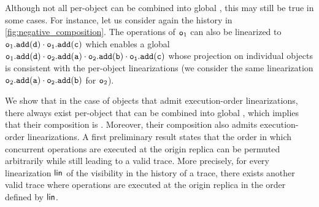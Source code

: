 Although not all per-object  can be combined into global , this may still be true in some cases. For instance, let us consider again the history in \autoref{fig:negative_composition}. The operations of $\mathtt{o}_1$ can also be linearized to $\aobj_1.\alabelshort[{\tt add}]{d}\cdot \aobj_1.\alabelshort[{\tt add}]{c}$ which enables a global \crdtlinearization{} $\aobj_1.\alabelshort[{\tt add}]{d}\cdot \aobj_2.\alabelshort[{\tt add}]{a}\cdot \aobj_2.\alabelshort[{\tt add}]{b}\cdot \aobj_1.\alabelshort[{\tt add}]{c}$ whose projection on individual objects is consistent with the per-object linearizations (we consider the same linearization $\aobj_2.\alabelshort[{\tt add}]{a}\cdot \aobj_2.\alabelshort[{\tt add}]{b}$ for $\mathtt{o}_2$).

We show that in the case of \crdtlinearizable{} objects that admit execution-order linearizations, there always exist per-object  that can be combined into global , which implies that their composition is \crdtlinearizable{}. Moreover, their composition also admits execution-order linearizations. A first preliminary result states that the order in which concurrent operations are executed at the origin replica can be permuted arbitrarily while still leading to a valid trace. More precisely, for every linearization $\mathsf{lin}$ of the visibility in the history of a trace, there exists another valid trace where operations are executed at the origin replica in the order defined by $\mathsf{lin}$.

